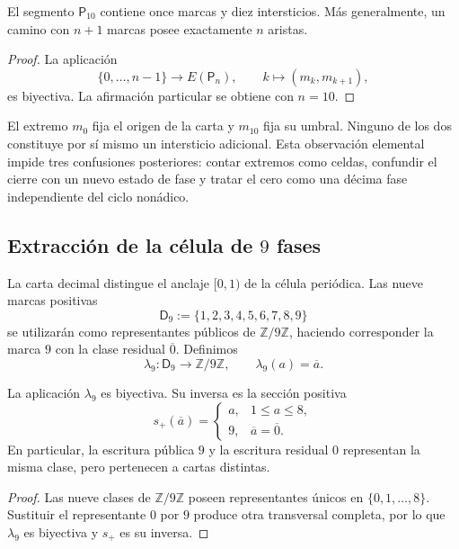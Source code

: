 \begin{lemma}
\label{p12-83-c1-s4:lem:censo-marcas-intersticios}
El segmento \(\mathsf P_{10}\) contiene once marcas y diez intersticios. Más
generalmente, un camino con \(n+1\) marcas posee exactamente \(n\) aristas.
\end{lemma}

\begin{proof}
La aplicación
\[
 \{0,\ldots,n-1\}\longrightarrow E(\mathsf P_n),
 \qquad k\longmapsto(m_k,m_{k+1}),
\]
es biyectiva. La afirmación particular se obtiene con \(n=10\).
\end{proof}

El extremo \(m_0\) fija el origen de la carta y \(m_{10}\) fija su umbral.
Ninguno de los dos constituye por sí mismo un intersticio adicional. Esta
observación elemental impide tres confusiones posteriores: contar extremos
como celdas, confundir el cierre con un nuevo estado de fase y tratar el cero
como una décima fase independiente del ciclo nonádico.

\subsection{Extracción de la célula de \(9\) fases}

La carta decimal distingue el anclaje \([0,1)\) de la célula periódica. Las
nueve marcas positivas
\[
 \mathsf D_9:=\{1,2,3,4,5,6,7,8,9\}
\]
se utilizarán como representantes públicos de
\(\mathbb Z/9\mathbb Z\), haciendo corresponder la marca \(9\) con la clase
residual \(\overline 0\). Definimos
\[
 \lambda_9:\mathsf D_9\longrightarrow\mathbb Z/9\mathbb Z,
 \qquad \lambda_9(a)=\overline a.
\]

\begin{proposition}
\label{p12-83-c1-s4:prop:carta-positiva-nonadica}
La aplicación \(\lambda_9\) es biyectiva. Su inversa es la sección positiva
\[
 s_+(\overline a)=
 \begin{cases}
 a,&1\leq a\leq8,\\
 9,&\overline a=\overline0.
 \end{cases}
\]
En particular, la escritura pública \(9\) y la escritura residual \(0\)
representan la misma clase, pero pertenecen a cartas distintas.
\end{proposition}

\begin{proof}
Las nueve clases de \(\mathbb Z/9\mathbb Z\) poseen representantes únicos en
\(\{0,1,\ldots,8\}\). Sustituir el representante \(0\) por \(9\) produce
otra transversal completa, por lo que \(\lambda_9\) es biyectiva y \(s_+\)
es su inversa.
\end{proof}

